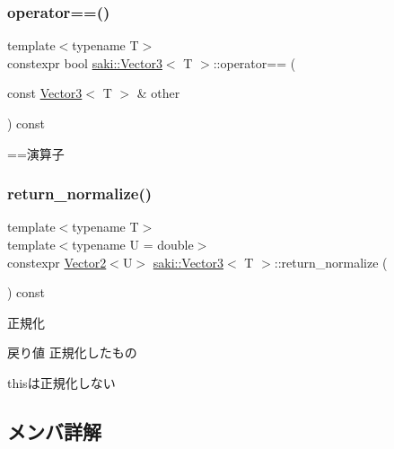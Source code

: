 \mbox{\label{classsaki_1_1_vector3_ad03a150d0fa01d9a673081cb0ceb150e}} 
\subsubsection{\texorpdfstring{operator==()}{operator==()}}
{\footnotesize\ttfamily template$<$typename T$>$ \\
constexpr bool \mbox{\hyperlink{classsaki_1_1_vector3}{saki\+::\+Vector3}}$<$ T $>$\+::operator== (\begin{DoxyParamCaption}\item[{const \mbox{\hyperlink{classsaki_1_1_vector3}{Vector3}}$<$ T $>$ \&}]{other }\end{DoxyParamCaption}) const\hspace{0.3cm}{\ttfamily [inline]}}



==演算子 

\mbox{\label{classsaki_1_1_vector3_ab4bbc1a8a3cbf860996a5136b3c1536f}} 
\subsubsection{\texorpdfstring{return\+\_\+normalize()}{return\_normalize()}}
{\footnotesize\ttfamily template$<$typename T$>$ \\
template$<$typename U  = double$>$ \\
constexpr \mbox{\hyperlink{classsaki_1_1_vector2}{Vector2}}$<$U$>$ \mbox{\hyperlink{classsaki_1_1_vector3}{saki\+::\+Vector3}}$<$ T $>$\+::return\+\_\+normalize (\begin{DoxyParamCaption}{ }\end{DoxyParamCaption}) const\hspace{0.3cm}{\ttfamily [inline]}}



正規化 

\begin{DoxyReturn}{戻り値}
正規化したもの
\end{DoxyReturn}
thisは正規化しない 

\subsection{メンバ詳解}
\mbox{\label{classsaki_1_1_vector3_a1fa58e9e75dbeb650afb3db740f3131c}} 
